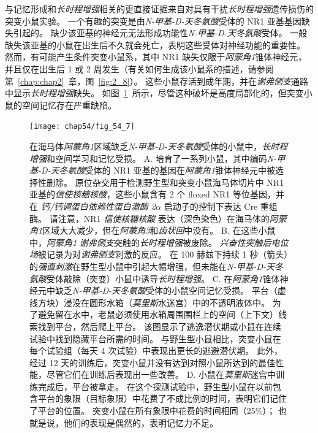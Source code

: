 与记忆形成和\textit{长时程增强}相关的更直接证据来自对具有干扰\textit{长时程增强}遗传损伤的突变小鼠实验。
一个有趣的突变是由\textit{N-甲基-D-天冬氨酸}受体的 NR1 亚基基因缺失引起的。
缺少该亚基的神经元无法形成功能性\textit{N-甲基-D-天冬氨酸}受体。
一般缺失该亚基的小鼠在出生后不久就会死亡，表明这些受体对神经功能的重要性。
然而，有可能产生条件突变小鼠系，其中 NR1 缺失仅限于\textit{阿蒙角1}锥体神经元，并且仅在出生后 1 或 2 周发生（有关如何生成该小鼠系的描述，请参阅第~\ref{chap:chap2}~章，图~\ref{fig:2_8}）。
这些小鼠存活到成年期，并在\textit{谢弗侧支}通路中显示\textit{长时程增强}缺失。
如图~\ref{fig:54_7}~所示，尽管这种破坏是高度局部化的，但突变小鼠的空间记忆存在严重缺陷。


\begin{figure}[htbp]
	\centering
	\texttt{[image: chap54/fig\_54\_7]}
	\caption{在海马体\textit{阿蒙角1}区域缺乏\textit{N-甲基-D-天冬氨酸}受体的小鼠中，\textit{长时程增强}和空间学习和记忆受损。
		A. 培育了一系列小鼠，其中编码\textit{N-甲基-D-天冬氨酸}受体的 NR1 亚基的基因在\textit{阿蒙角1}锥体神经元中被选择性删除。
		原位杂交用于检测野生型和突变小鼠海马体切片中 NR1 亚基的\textit{信使核糖核酸}，这些小鼠含有 2 个 floxed NR1 等位基因，并在 \textit{钙/钙调蛋白依赖性蛋白激酶 2}$\alpha$ 启动子的控制下表达 Cre 重组酶。
		请注意，NR1 \textit{信使核糖核酸} 表达（深色染色）在海马体的\textit{阿蒙角1}区域大大减少，但在\textit{阿蒙角3}和\textit{齿状回}中没有。
		B. 在这些小鼠中，\textit{阿蒙角1} \textit{谢弗侧支}突触的\textit{长时程增强}被废除。
		\textit{兴奋性突触后电位场}被记录为对\textit{谢弗侧支}刺激的反应。
		在 100 赫兹下持续 1 秒（箭头）的\textit{强直刺激}在野生型小鼠中引起大幅增强，但未能在\textit{N-甲基-D-天冬氨酸}受体敲除（突变）小鼠中诱导\textit{长时程增强}。
		C. 在\textit{阿蒙角1}锥体神经元中缺乏\textit{N-甲基-D-天冬氨酸}受体的小鼠空间记忆受损。
		平台（虚线方块）浸没在圆形水箱（\textit{莫里斯}水迷宫）中的不透明液体中。
		为了避免留在水中，老鼠必须使用水箱周围围栏上的空间（上下文）线索找到平台，然后爬上平台。
		该图显示了逃逸潜伏期或小鼠在连续试验中找到隐藏平台所需的时间。
		与野生型小鼠相比，突变小鼠在每个试验组（每天 4 次试验）中表现出更长的逃避潜伏期。
		此外，经过 12 天的训练后，突变小鼠并没有达到对照小鼠所达到的最佳性能，尽管它们在训练后表现出一些改善。
		D. 小鼠在\textit{莫里斯}迷宫中训练完成后，平台被拿走。
		在这个探测试验中，野生型小鼠在以前包含平台的象限（目标象限）中花费了不成比例的时间，表明它们记住了平台的位置。
		突变小鼠在所有象限中花费的时间相同（25\%）；
		也就是说，他们的表现是偶然的，表明记忆力不足。}
	\label{fig:54_7}
\end{figure}


